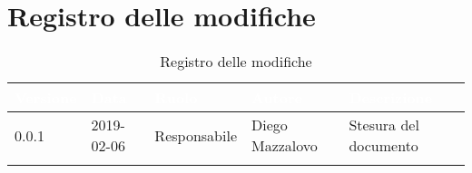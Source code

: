 \newpage

\section{Registro delle modifiche}

\begin{center}
\begin{longtable}[c]{|m{}|m{}|m{}|m{}|p{}|}
\hline
\rowcolor{bluelogo}\textbf{\textcolor{white}{Versione}} & \textbf{\textcolor{white}{Data}} & \textbf{\textcolor{white}{Ruolo}} & \textbf{\textcolor{white}{Autore}} & \textbf{\textcolor{white}{Descrizione}}\\
\hline 
\endfirsthead
0.0.1 & 2019-02-06 & Responsabile & Diego Mazzalovo & Stesura del documento \\
\hline
\caption{Registro delle modifiche}
\end{longtable}
\end{center}